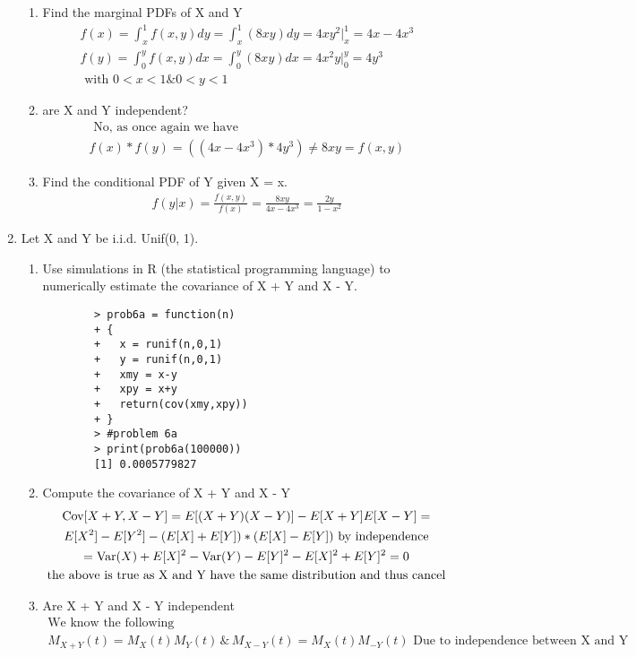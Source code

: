 \documentclass[11pt]{article}
\newcommand{\Var}{\mathop{\rm Var}}
\newcommand{\Cov}{\mathop{\rm Cov}}
\begin{document}
\begin{enumerate}
\begin{enumerate}
	\item Find the marginal PDFs of X and Y
	\begin{gather}
	f(x) = \int_{x}^{1}f(x,y)dy = \int_{x}^{1}(8xy)dy  = 4xy^2\big|_x^1 = 4x - 4x^3 \\
	f(y) = \int_{0}^{y}f(x,y)dx = \int_{0}^{y}(8xy)dx  = 4x^2y\big|_0^y = 4y^3\\
	\text{ with } 0<x<1 \& 0<y<1
	\end{gather}
	\item are X and Y independent?
	\begin{gather}
		\text{ No, as once again we have }\\
		f(x)*f(y) = ((4x - 4x^3) * 4y^3) \ne 8xy = f(x,y)
	\end{gather}
	\item Find the conditional PDF of Y given X = x.
	\begin{gather}
		f(y|x) = \frac{f(x,y)}{f(x)} = \frac{8xy}{4x - 4x^3} = \frac{2y}{1 - x^2}
	\end{gather}
\end{enumerate}
\item Let X and Y be i.i.d. Unif(0, 1).
\begin{enumerate}
	\item Use simulations in R (the statistical programming language) to numerically estimate the covariance
	of X + Y and X - Y.
	\begin{verbatim}
		> prob6a = function(n)
		+ {
		+   x = runif(n,0,1)
		+   y = runif(n,0,1)
		+   xmy = x-y
		+   xpy = x+y
		+   return(cov(xmy,xpy))
		+ }
		> #problem 6a
		> print(prob6a(100000))
		[1] 0.0005779827
	\end{verbatim}
	\item Compute the covariance of X + Y and X - Y
	\begin{gather}
		\Cov[X+Y,X-Y] = E[(X+Y)(X-Y)] - E[X+Y]E[X-Y] =\\
		  E[X^2] - E[Y^2] - (E[X]+E[Y])*(E[X]-E[Y]) \text{ by independence}\\
		  = \Var(X)+E[X]^2 - \Var(Y)-E[Y]^2 - E[X]^2 + E[Y]^2 = 0\\
		  \text{the above is true as X and Y have the same distribution and thus cancel}
	\end{gather}
	\item Are X + Y and X - Y independent
	\begin{gather}
		\text{We know the following}\\
		M_{X+Y}(t)=M_X(t)M_Y(t)\,\&\,M_{X-Y}(t)=M_X(t)M_{-Y}(t) \text{ Due to independence between X and Y}\\

\end{gather}
\end{enumerate}
\end{enumerate}
\end{document}
